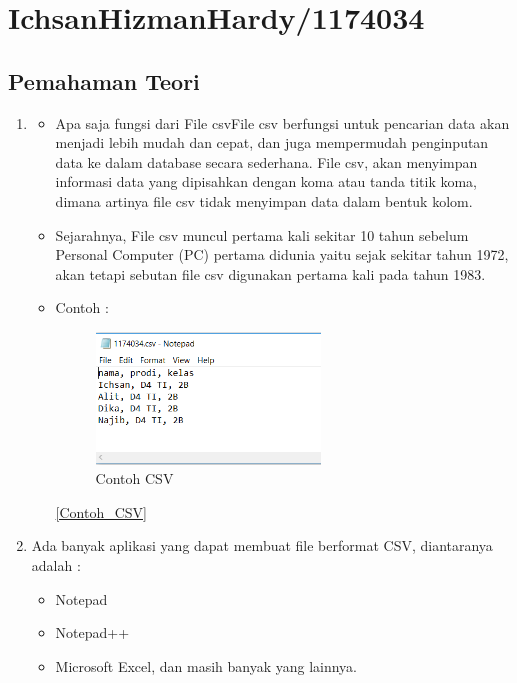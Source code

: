 \section{IchsanHizmanHardy/1174034}
	\subsection{Pemahaman Teori}
		\begin{enumerate}
			\item \begin{itemize}
					\item Apa saja fungsi dari File csvFile csv berfungsi untuk pencarian data akan menjadi lebih mudah dan cepat, dan juga mempermudah penginputan data ke dalam database secara sederhana. File csv, akan menyimpan informasi data yang dipisahkan dengan koma atau tanda titik koma, dimana artinya file csv tidak menyimpan data dalam bentuk kolom.
					\item Sejarahnya, File csv muncul pertama kali sekitar 10 tahun sebelum Personal Computer (PC) pertama  didunia yaitu sejak sekitar tahun 1972, akan tetapi sebutan file csv digunakan pertama kali pada tahun 1983.
					\item Contoh : 
						\begin{figure} [ht]
							\centerline{\includegraphics[width=0.6\textwidth]{figures/chapter4/1174034.png}}
							\caption{Contoh CSV}
							\label{Contoh CSV}
						\end{figure}

					\ref{Contoh_CSV}
				\end{itemize}
			
			\item Ada banyak aplikasi yang dapat membuat file berformat CSV, diantaranya adalah :
				\begin{itemize}
					\item Notepad
					\item Notepad++
					\item Microsoft Excel, dan masih banyak yang lainnya.
				\end{itemize}
			

\end{enumerate}
